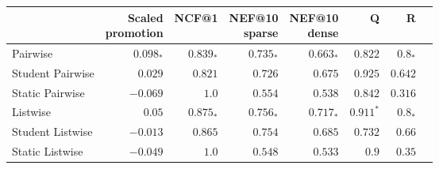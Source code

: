 \begin{tabular}{lrrrrrrr}
\toprule
             & \makecell{Scaled \\ promotion} & NCF@1 & \makecell{NEF@10 \\ sparse} & \makecell{NEF@10 \\ dense} & Q & R \\
\midrule
Pairwise              & $0.098_{*}$ & $0.839_{*}$ & $0.735_{*}$ & $0.663_{*}$ & $0.822$ & $0.8_{*}$ \\
Student Pairwise       & $0.029$ & $0.821$ & $0.726$ & $0.675$ & $0.925$ & $0.642$ \\
Static Pairwise        & $-0.069$ & $1.0$ & $0.554$ & $0.538$ & $0.842$ & $0.316$ \\
Listwise               & $0.05$ & $0.875_{*}$ & $0.756_{*}$ & $0.717_{*}$ & $0.911^{*}$ & $0.8_{*}$ \\
Student Listwise       & $-0.013$ & $0.865$ & $0.754$ & $0.685$ & $0.732$ & $0.66$ \\
Static Listwise        & $-0.049$ & $1.0$ & $0.548$ & $0.533$ & $0.9$ & $0.35$ \\
\bottomrule
\end{tabular}


